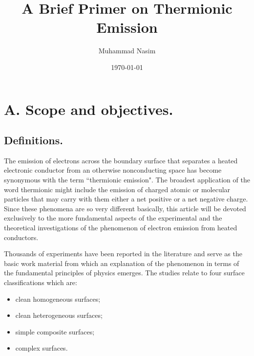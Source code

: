 \documentclass[11pt,a4paper]{article}
\begin{document}
	
	\title{A Brief Primer on Thermionic Emission}
	\author{Muhammad Nasim}
	\date{\today}
	
	\maketitle
	\flushbottom
	
	\newpage
	
	\section{A. Scope and objectives.}
	
	\subsection{Definitions.}
	The emission of electrons across the boundary surface that
	separates a heated electronic conductor from an otherwise nonconducting space
	has become synonymous with the term ``thermionic emission". The broadest
	application of the word thermionic might include the emission of charged atomic
	or molecular particles that may carry with them either a net positive or a net
	negative charge. Since these phenomena are so very different basically, this
	article will be devoted exclusively to the more fundamental aspects of the
	experimental and the theoretical investigations of the phenomenon of electron
	emission from heated conductors.
	
	Thousands of experiments have been reported in the literature and serve
	as the basic work material from which an explanation of the phenomenon in
	terms of the fundamental principles of physics emerges. The studies relate to
	four surface classifications which are:
	
	\begin{itemize}
		
		\item clean homogeneous surfaces;
	
		\item clean heterogeneous surfaces;
		
		\item simple composite surfaces;
		
		\item complex surfaces.
		
	\end{itemize}
	
\end{document}
